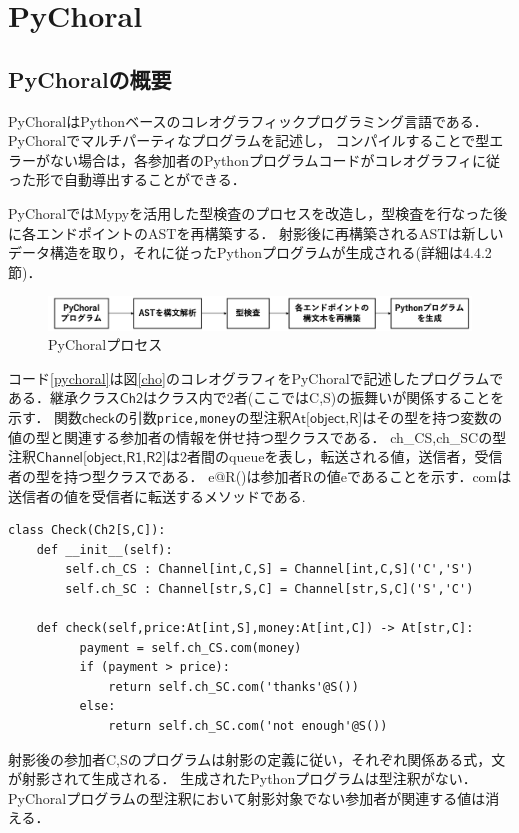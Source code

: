 \documentclass{thesis}
\begin{document}
\chapter{PyChoral}
\section{PyChoralの概要}
PyChoralはPythonベースのコレオグラフィックプログラミング言語である．PyChoralでマルチパーティなプログラムを記述し，
コンパイルすることで型エラーがない場合は，各参加者のPythonプログラムコードがコレオグラフィに従った形で自動導出することができる．

PyChoralではMypyを活用した型検査のプロセスを改造し，型検査を行なった後に各エンドポイントのASTを再構築する．
射影後に再構築されるASTは新しいデータ構造を取り，それに従ったPythonプログラムが生成される(詳細は4.4.2節)．

\begin{figure}[H]
  \centering
  \includegraphics[scale=0.4]{image/pychoralprocess.png}
  \caption{PyChoralプロセス}
  \label{pychoralprocess}
\end{figure}

コード\ref{pychoral}は図\ref{cho}のコレオグラフィをPyChoralで記述したプログラムである．継承クラス$\textsf{Ch2}$はクラス内で2者(ここではC,S)の振舞いが関係することを示す．
関数$\textsf{check}$の引数\texttt{price,money}の型注釈$\textsf{At[object,R]}$はその型を持つ変数の値の型と関連する参加者の情報を併せ持つ型クラスである．
\textsf{ch\_CS,ch\_SC}の型注釈$\textsf{Channel[object,R1,R2]}$は2者間のqueueを表し，転送される値，送信者，受信者の型を持つ型クラスである．
\textsf{e@R()}は参加者Rの値eであることを示す．\textsf{com}は送信者の値を受信者に転送するメソッドである.
\begin{lstlisting}[caption=PyChoral,label=pychoral]
class Check(Ch2[S,C]):
    def __init__(self):
        self.ch_CS : Channel[int,C,S] = Channel[int,C,S]('C','S')
        self.ch_SC : Channel[str,S,C] = Channel[str,S,C]('S','C')

    def check(self,price:At[int,S],money:At[int,C]) -> At[str,C]:
          payment = self.ch_CS.com(money)
          if (payment > price):
              return self.ch_SC.com('thanks'@S())
          else:
              return self.ch_SC.com('not enough'@S())
\end{lstlisting}
射影後の参加者C,Sのプログラムは射影の定義に従い，それぞれ関係ある式，文が射影されて生成される．
生成されたPythonプログラムは型注釈がない．PyChoralプログラムの型注釈において射影対象でない参加者が関連する値は消える．
\end{document}
